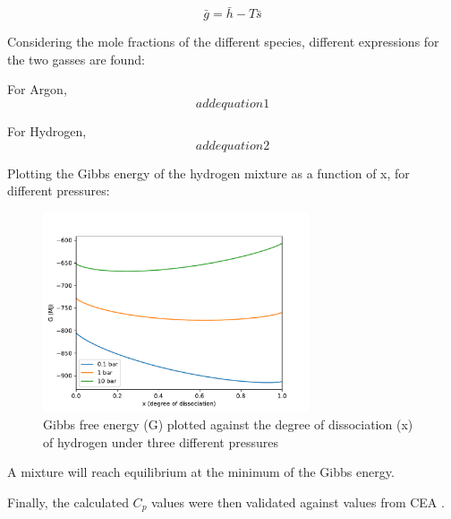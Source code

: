         \begin{equation}
            \bar g = \bar h - T \bar s
        \end{equation}

        Considering the mole fractions of the different species, different expressions for the two gasses are found:

        For Argon,
        \begin{equation}
            add equation 1
        \end{equation}

        For Hydrogen,
        \begin{equation}
            add equation 2 
        \end{equation}


        Plotting the Gibbs energy of the hydrogen mixture as a function of x, for different pressures:

        \begin{figure}[!ht]
            \centering
            \includegraphics[width=0.7\textwidth]{assets/2 models/Gibbs.pdf}
            \caption{Gibbs free energy (G) plotted against the degree of dissociation (x) of hydrogen under three different pressures}
            \label{fig:Gibbs}
        \end{figure}

        A mixture will reach equilibrium at the minimum of the Gibbs energy.

        Finally, the calculated $C_p$ values were then validated against values from CEA \cite{CEARUNRev4}.
        
